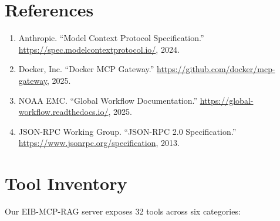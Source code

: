 \documentclass[11pt,letterpaper]{article}
\begin{document}
\section*{References}

\begin{enumerate}[noitemsep]
    \item Anthropic. ``Model Context Protocol Specification.'' \url{https://spec.modelcontextprotocol.io/}, 2024.
    \item Docker, Inc. ``Docker MCP Gateway.'' \url{https://github.com/docker/mcp-gateway}, 2025.
    \item NOAA EMC. ``Global Workflow Documentation.'' \url{https://global-workflow.readthedocs.io/}, 2025.
    \item JSON-RPC Working Group. ``JSON-RPC 2.0 Specification.'' \url{https://www.jsonrpc.org/specification}, 2013.
\end{enumerate}

\appendix
\section{Tool Inventory}

Our EIB-MCP-RAG server exposes 32 tools across six categories:
\end{document}
